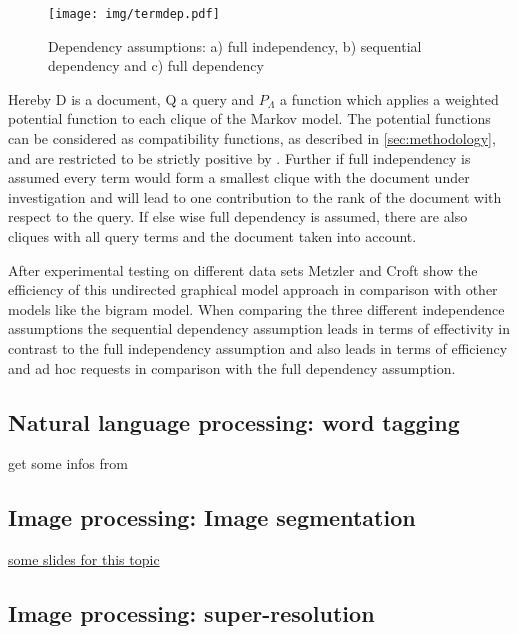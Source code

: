 \begin{figure}[htpb]
  \centering
  	\texttt{[image: img/termdep.pdf]}
  \caption{Dependency assumptions: a) full independency, b) sequential dependency and c) full dependency}
  \label{fig:termdep}
\end{figure}

Hereby D is a document, Q a query and $P_\Lambda$ a function which applies a weighted potential function to each clique of the Markov model. The potential functions can be considered as compatibility functions, as described in \ref{sec:methodology}, and are restricted to be strictly positive by \cite{metzler2005markov}. Further if full independency is assumed every term would form a smallest clique with the document under investigation and will lead to one contribution to the rank of the document with respect to the query. If else wise full dependency is assumed, there are also cliques with all query terms and the document taken into account.

After experimental testing on different data sets Metzler and Croft show the efficiency of this undirected graphical model approach in comparison with other models like the bigram model. When comparing the three different independence assumptions the sequential dependency assumption leads in terms of effectivity in contrast to the full independency assumption and also leads in terms of efficiency and ad hoc requests in comparison with the full dependency assumption.


\subsection{Natural language processing: word tagging}
\label{sec:tag}

get some infos from \cite{collobert2011natural}

\subsection{Image processing: Image segmentation}

\href{https://inf.u-szeged.hu/~ssip/2008/presentations2/Kato_ssip2008.pdf}{some slides for this topic}

\cite{kato2006markov}

\subsection{Image processing: super-resolution}
\label{sec:image}

